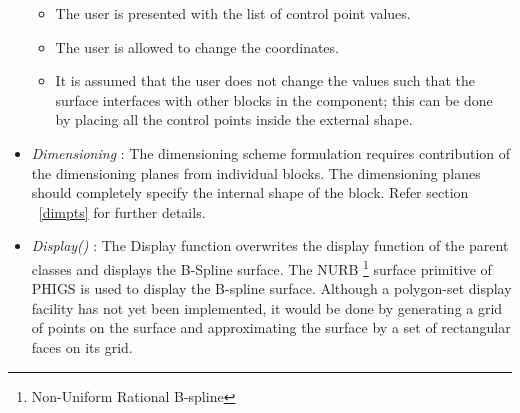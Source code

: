 \begin{itemize}
			\begin{itemize}
			\item
			The user is presented with the list of control point values.
			\item
			The user is allowed to change the coordinates.
			\item
			It is assumed that the user does not change the values such that 
			the surface interfaces with other blocks in the component; this
			can be done by placing all the control points inside the external
			shape.
			\end{itemize}

		\item
		\label{genpts}
		{\em Dimensioning} : The dimensioning scheme formulation requires
		contribution of the dimensioning planes from individual blocks. The
		dimensioning planes should completely specify the internal shape of the
		block. Refer section ~\ref{dimpts} for further details. 

		\item
        {\em Display()} :
        The Display function 
        overwrites the display function of the parent classes and
		displays the B-Spline surface. The NURB \footnote{ Non-Uniform Rational
		B-spline} surface primitive of PHIGS is used to display the B-spline
		surface. Although a polygon-set display facility has not yet been
		implemented, it would be done by generating a grid of points on the
		surface and approximating the surface by a set of rectangular faces
		on its grid.

        \end{itemize}

